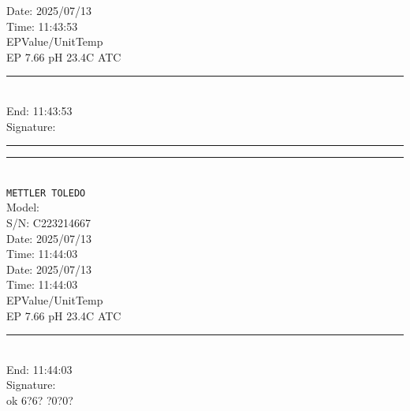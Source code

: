 \documentclass[UTF8,10pt,a4paper,fontset=fandol]{ctexart}
\newcommand{\fieldvalue}[1]{#1}
\newcommand{\handwritten}[1]{#1}
\begin{document}
\begin{center}
\begin{minipage}{0.32\textwidth}
Date:
\fieldvalue{2025/07/13}\\
Time:
\fieldvalue{11:43:53}\\
EP\quad Value/Unit\quad Temp\\
EP
\fieldvalue{7.66 pH}
\quad
\fieldvalue{23.4\textdegree C ATC}\\[0.5em]

\noindent\rule{\linewidth}{0.2pt}\\[-0.2em]
End:
\fieldvalue{11:43:53}\\
Signature: \\
\rule{\linewidth}{0.2pt}

\vspace{1em}
\noindent\rule{\linewidth}{0.2pt}\\[-0.2em]
\texttt{METTLER TOLEDO}\\
Model: \\
S/N:
\fieldvalue{C223214667}\\
Date:
\fieldvalue{2025/07/13}\\
Time:
\fieldvalue{11:44:03}\\[0.5em]

Date:
\fieldvalue{2025/07/13}\\
Time:
\fieldvalue{11:44:03}\\
EP\quad Value/Unit\quad Temp\\
EP
\fieldvalue{7.66 pH}
\quad
\fieldvalue{23.4\textdegree C ATC}\\[0.5em]

\noindent\rule{\linewidth}{0.2pt}\\[-0.2em]
End:
\fieldvalue{11:44:03}\\
Signature: \\
\fieldvalue{\handwritten{ok 6?6? ?0?0?}}
\end{minipage}
\end{center}
\end{document}
